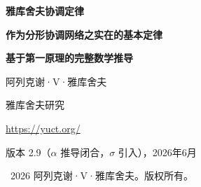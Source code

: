\documentclass[12pt,a4paper]{article}
\theoremstyle{remark}
\begin{document}
	
	\begin{titlepage}
		\centering
		\vspace*{2cm}
		
		{\Huge\bfseries 雅库舍夫协调定律\par}
		\vspace{0.5cm}
		{\Large\bfseries 作为分形协调网络之实在的基本定律\par}
		\vspace{0.3cm}
		{\Large\bfseries 基于第一原理的完整数学推导\par}
		
		\vspace{1.5cm}
		
		{\large 阿列克谢·V·雅库舍夫\par}
		\vspace{0.3cm}
		{\normalsize 雅库舍夫研究\par}
		\vspace{0.2cm}
		{\normalsize \url{https://yuct.org/}\par}
		
		\vspace{1.0cm}
		{\normalsize 版本 2.9（$\alpha$ 推导闭合，$\sigma$ 引入），2026年6月\par}
		
		\vfill
		
		\begin{abstract}
			\noindent
			我们给出雅库舍夫协调定律的完整数学推导——该定律是支配宇宙中所有稳定结构的基本原理。定律以单一陈述表述，并由一个公理（分形标度不变性）和协调协议 YPSDC 的定义导出。我们证明三个结构定理：最小词典熵恰为两比特；空间维数必然为三；时间是协调不完善性的涌现度量。通用误差定律以其正确的稳态幂律形式 $\varepsilon = \kappa_c \alpha K_{\mathrm{eff}}^{-\beta}$ 导出，其中 $\beta=2/3$，$\kappa_c=1/3$。代数环常数 $S_{\mathrm{odd}}=1.2$，$S_{\mathrm{even}}=0.8$。标度量子 $q = (3/2)^{1/3}$ 生成通用质量阶梯。精细结构常数 $\alpha^{-1} \approx 137.036$ 由紧致纤维 $F_{18}$ 的拓扑不变量与普适移位 $\sigma = (S_{\mathrm{odd}}-S_{\mathrm{even}})/2 = 0.20$ 完全确定，无须任何经验拟合。宇宙学常数 $\Omega_\Lambda = 2/3$ 出自同一拓扑。电弱标度由韦尔费米子计数 $L=96$ 结合几何调节因子 $(\kappa_c\pi_{\mathrm{YUCT}})^{-1/2}$ 得到，无需任何唯象拟合。进一步地，同一代数环给出素数分布的零参数渐近修正（定理~4）。三个形式化公设——通用误差定律、量化深度和相位周期性——为素数涨落提供一个闭合解析模型，并受普朗克标度约束。该定律在物理、生物、数论和宇宙学中做出八个具体且可证伪的预言，且不含任何可调连续参数。
		\end{abstract}
		
		\vspace{1cm}
		\textcopyright\ 2026 阿列克谢·V·雅库舍夫。版权所有。
	\end{titlepage}
	
\end{document}
